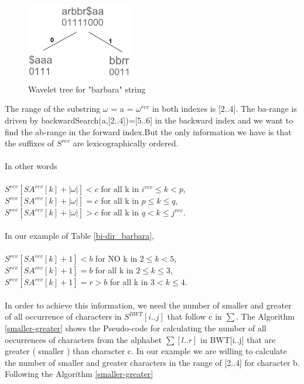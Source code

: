 \documentclass[11pt,a4paper]{report}
\begin{document}
\begin{figure}[H]
\centering
\includegraphics[width=4.75cm]{pictures/WavletBarbara.png}
\caption{Wavelet tree for "barbara" string }
\label{Wavlet-barbara}
\end{figure}
The range of the substring   
$\omega$ = a = $\omega^{rev}$ in both indexes is [2..4].
The ba-range is driven by backwardSearch(a,[2..4])=[5..6]  
in the backward index and we want to find the ab-range in
the forward index.But the only information we have is that 
the suffixes of $S^{rev}$ are lexicographically ordered. \\\\
In other words \cite{bidirectional}\\\\
$S^{rev}[SA^{rev}[k]+|\omega|] < c$ for all k in $i^{rev}  \leq k  < p$,\\
$S^{rev}[SA^{rev}[k]+|\omega|] = c$ for all k in  $p  \leq  k  \leq  q $,\\
$S^{rev}[SA^{rev}[k]+|\omega|] > c$ for all k in  $q <   k \leq   j^{rev}$.\\\\
In our example of Table \ref{bi-dir_barbara},\\\\
$S^{rev}[SA^{rev}[k]+1] < b $ for NO  k in $ 2 \leq k  < 5 $,\\
$S^{rev}[SA^{rev}[k]+1] = b $ for all k in $ 2  \leq  k  \leq  3 $,\\
$S^{rev}[SA^{rev}[k]+1] = r > b $ for all k in $ 3   < k  \leq  4 $.\\\\
In order to achieve this information, we need the number of smaller
and greater of all occurrence of characters in $S^{BWT}[i..j]$ 
that follow c in $\sum$. The Algorithm \ref{smaller-greater} 
shows  the Pseudo-code for calculating the number of all occurrences 
of characters from the alphabet $\sum[l..r]$ in BWT[i..j] that 
are greater ( smaller ) than character c. In our example 
we are willing to calculate the number of smaller and greater 
characters in the range of [2..4] for character b.  
Following the Algorithm \ref{smaller-greater} \cite{bidirectional} 
\end{document}
